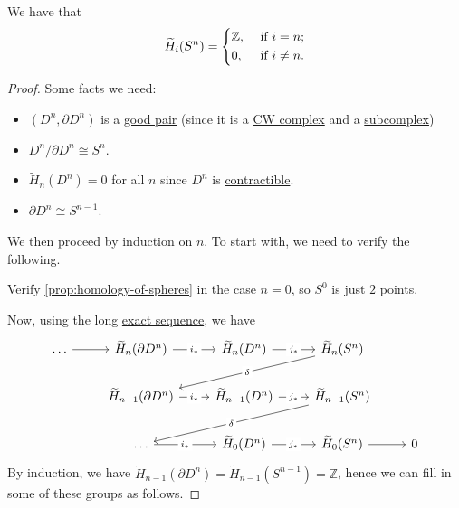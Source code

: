 \begin{proposition}\label{prop:homology-of-spheres}
	We have that
	\[
		\widetilde{H}_i(S^n) = \begin{dcases}
			\mathbb{Z} , & \text{ if } i = n ;    \\
			0,           & \text{ if } i \neq n .
		\end{dcases}
	\]
\end{proposition}
\begin{proof}
	Some facts we need:
	\begin{itemize}
		\item \((D^n, \partial D^n)\) is a \hyperref[def:good-pair]{good pair} (since it is a \hyperref[def:CW-Complex]{CW complex}
		      and a \hyperref[def:CW-subcomplex]{subcomplex})
		\item \(D^n /\partial D^n \cong S^n\).
		\item \(\widetilde{H}_n(D^n) = 0\) for all \(n\) since \(D^n\) is \hyperref[def:contractible]{contractible}.
		\item \(\partial D^n \cong S^{n - 1}\).
	\end{itemize}
	We then proceed by induction on \(n\). To start with, we need to verify the following.
	\begin{exercise}
		Verify \autoref{prop:homology-of-spheres} in the case \(n = 0\), so \(S^0 \) is just \(2\) points.
	\end{exercise}
	Now, using the long \hyperref[def:exact-sequence]{exact sequence}, we have
	\[
		\begin{tikzcd}
			\ldots & {\widetilde{H}_n(\partial D^n)} & {\widetilde{H}_n(D^n)} & {\widetilde{H}_n(S^n)} \\
			& {\widetilde{H}_{n-1}(\partial D^n)} & {\widetilde{H}_{n-1}(D^n)} & {\widetilde{H}_{n-1}(S^n)} \\
			& \ldots & {\widetilde{H}_{0}(D^n)} & {\widetilde{H}_{0}(S^n)} & 0
			\arrow["{j_\ast}"{description}, from=1-3, to=1-4]
			\arrow["{j_\ast}"{description}, from=2-3, to=2-4]
			\arrow[from=3-4, to=3-5]
			\arrow["{i_\ast}"{description}, from=2-2, to=2-3]
			\arrow["{i_\ast}"{description}, from=1-2, to=1-3]
			\arrow[from=1-1, to=1-2]
			\arrow["\delta"{description}, from=1-4, to=2-2]
			\arrow["\delta"{description}, from=2-4, to=3-2]
			\arrow["{j_\ast}"{description}, from=3-3, to=3-4]
			\arrow["{i_\ast}"{description}, from=3-2, to=3-3]
		\end{tikzcd}
	\]
	By induction, we have \(\widetilde{H} _{n-1}(\partial D^n) = \widetilde{H} _{n-1}(S^{n-1}) = \mathbb{Z} \), hence we can fill in some of these groups as follows.

\end{proof}

